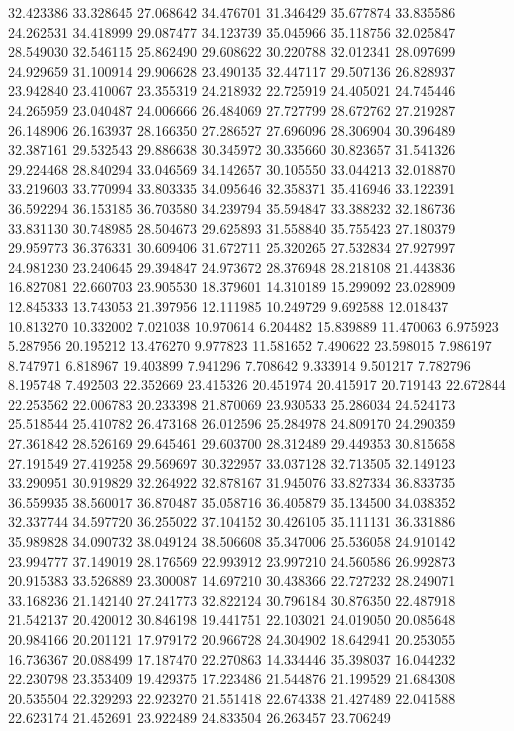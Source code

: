 32.423386
33.328645
27.068642
34.476701
31.346429
35.677874
33.835586
24.262531
34.418999
29.087477
34.123739
35.045966
35.118756
32.025847
28.549030
32.546115
25.862490
29.608622
30.220788
32.012341
28.097699
24.929659
31.100914
29.906628
23.490135
32.447117
29.507136
26.828937
23.942840
23.410067
23.355319
24.218932
22.725919
24.405021
24.745446
24.265959
23.040487
24.006666
26.484069
27.727799
28.672762
27.219287
26.148906
26.163937
28.166350
27.286527
27.696096
28.306904
30.396489
32.387161
29.532543
29.886638
30.345972
30.335660
30.823657
31.541326
29.224468
28.840294
33.046569
34.142657
30.105550
33.044213
32.018870
33.219603
33.770994
33.803335
34.095646
32.358371
35.416946
33.122391
36.592294
36.153185
36.703580
34.239794
35.594847
33.388232
32.186736
33.831130
30.748985
28.504673
29.625893
31.558840
35.755423
27.180379
29.959773
36.376331
30.609406
31.672711
25.320265
27.532834
27.927997
24.981230
23.240645
29.394847
24.973672
28.376948
28.218108
21.443836
16.827081
22.660703
23.905530
18.379601
14.310189
15.299092
23.028909
12.845333
13.743053
21.397956
12.111985
10.249729
9.692588
12.018437
10.813270
10.332002
7.021038
10.970614
6.204482
15.839889
11.470063
6.975923
5.287956
20.195212
13.476270
9.977823
11.581652
7.490622
23.598015
7.986197
8.747971
6.818967
19.403899
7.941296
7.708642
9.333914
9.501217
7.782796
8.195748
7.492503
22.352669
23.415326
20.451974
20.415917
20.719143
22.672844
22.253562
22.006783
20.233398
21.870069
23.930533
25.286034
24.524173
25.518544
25.410782
26.473168
26.012596
25.284978
24.809170
24.290359
27.361842
28.526169
29.645461
29.603700
28.312489
29.449353
30.815658
27.191549
27.419258
29.569697
30.322957
33.037128
32.713505
32.149123
33.290951
30.919829
32.264922
32.878167
31.945076
33.827334
36.833735
36.559935
38.560017
36.870487
35.058716
36.405879
35.134500
34.038352
32.337744
34.597720
36.255022
37.104152
30.426105
35.111131
36.331886
35.989828
34.090732
38.049124
38.506608
35.347006
25.536058
24.910142
23.994777
37.149019
28.176569
22.993912
23.997210
24.560586
26.992873
20.915383
33.526889
23.300087
14.697210
30.438366
22.727232
28.249071
33.168236
21.142140
27.241773
32.822124
30.796184
30.876350
22.487918
21.542137
20.420012
30.846198
19.441751
22.103021
24.019050
20.085648
20.984166
20.201121
17.979172
20.966728
24.304902
18.642941
20.253055
16.736367
20.088499
17.187470
22.270863
14.334446
35.398037
16.044232
22.230798
23.353409
19.429375
17.223486
21.544876
21.199529
21.684308
20.535504
22.329293
22.923270
21.551418
22.674338
21.427489
22.041588
22.623174
21.452691
23.922489
24.833504
26.263457
23.706249
